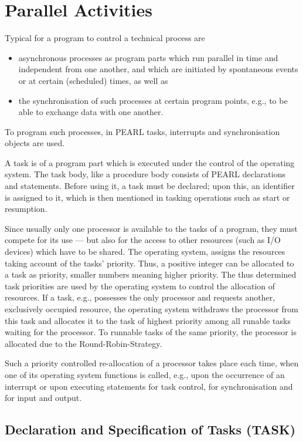 \chapter{Parallel Activities}  %

Typical for a program to control a technical process are
\begin{itemize}
\item asynchronous processes as program parts which run parallel in time 
and independent from one another, and which are initiated by
spontaneous events or at certain (scheduled) times, as well as
\item the synchronisation of such processes at certain program points,
e.g., to be able to exchange data with one another.
\end{itemize}

To program such processes, in PEARL tasks, interrupts and
synchronisation objects are used.

A task is of a program part which is executed under the control of the
operating system. The task body, like a procedure body consists of PEARL 
declarations and statements. Before using it, a task must be declared; 
upon this, an identifier is assigned to it, which is then mentioned 
in tasking operations such as start or resumption.

Since usually only one processor is available to the tasks of a program,
they must compete for its use --- but also for the access to other
resources (such as I/O devices) which have to be shared. The
operating system, assigns the resources taking account of
the tasks' priority. Thus, a positive integer can be allocated to a task
as priority, smaller numbers meaning higher priority. The thus
determined task priorities are used by the operating system to control
the allocation of resources. If a task, e.g., possesses the only
processor and requests another, exclusively occupied resource, the
operating system withdraws the processor from this task and allocates it to
the task of highest priority among all runable  tasks waiting for the
processor. To runnable tasks of the same priority, the processor is
allocated due to the Round-Robin-Strategy.

Such a priority controlled re-allocation of a processor takes place each
time, when one of its operating system functions is called, e.g., upon
the occurrence of an interrupt or upon executing statements for task 
control, for synchronisation and for input and output.

\section{Declaration and Specification of Tasks (TASK)}   %

